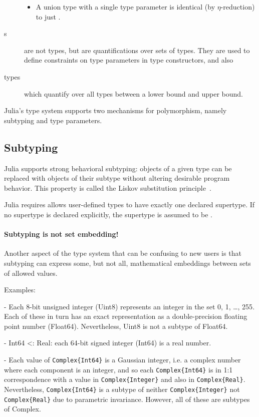\documentclass[pldi]{sigplanconf-pldi15}
\begin{document}
\begin{description}
\begin{itemize}
		\item A union type  with a single type parameter
			 is identical (by $\eta$-reduction) to just
			.
	\end{itemize}

\item[\code{TypeVar}s] are not types, but are quantifications over sets of
	types. They are used to define constraints on type parameters in type
	constructors, and also
	
\item[\code{ForAll} types] which quantify over all types between a lower bound
	and upper bound.

\end{description}

Julia's type system supports two mechanisms for polymorphism, namely subtyping
and type parameters. 


\subsection{Subtyping}

Julia supports strong behavioral subtyping: objects of a given type can be
replaced with objects of their subtype without altering desirable program
behavior. This property is called the Liskov substitution
principle~\cite{Liskov1974}.

Julia requires allows user-defined types to have exactly one declared supertype.
If no supertype is declared explicitly, the supertype is assumed to be .


\paragraph{Subtyping is not set embedding!}
Another aspect of the type system that can be confusing to new users is that
subtyping can express some, but not all, mathematical embeddings between sets
of allowed values.

Examples:

- Each 8-bit unsigned integer (Uint8) represents an integer in the set {0, 1,
\dots, 255}. Each of these in turn has an exact representation as a
double-precision floating point number (Float64). Nevertheless, Uint8 is not a
subtype of Float64.

- Int64 <: Real: each 64-bit signed integer (Int64) is a real number.

- Each value of \verb|Complex{Int64}| is a Gaussian integer, i.e. a complex number
where each component is an integer, and so each \verb|Complex{Int64}| is in 1:1
correspondence with a value in \verb|Complex{Integer}| and also in \verb|Complex{Real}|.
Nevertheless, \verb|Complex{Int64}| is a subtype of neither \verb|Complex{Integer}| not
\verb|Complex{Real}| due to parametric invariance. However, all of these are subtypes
of Complex.
\end{document}
